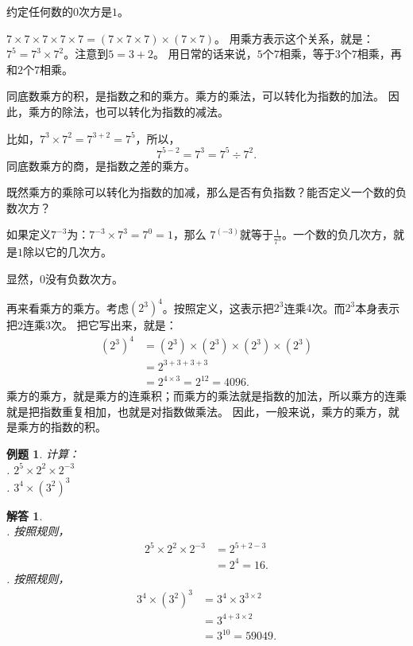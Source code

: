 \documentclass[12pt,UTF8]{ctexbook}
\newtheorem{et}{例题}[section]
\newtheorem*{so}{解答}
\begin{document}
约定任何数的$0$次方是$1$。

$7\times 7\times 7\times 7\times 7 = (7\times 7\times 7)\times (7\times 7)$。
用乘方表示这个关系，就是：$7^5 = 7^3 \times 7^2$。注意到$5 = 3 + 2$。
用日常的话来说，$5$个$7$相乘，等于$3$个$7$相乘，再和$2$个$7$相乘。

同底数乘方的积，是指数之和的乘方。乘方的乘法，可以转化为指数的加法。
因此，乘方的除法，也可以转化为指数的减法。

比如，$7^3 \times 7^2 = 7^{3+2} = 7^5$，所以，
$$7^{5-2} = 7^3 = 7^5 \div 7^2.$$
同底数乘方的商，是指数之差的乘方。

既然乘方的乘除可以转化为指数的加减，那么是否有负指数？能否定义一个数的负数次方？

如果定义$7^{-3}$为：$7^{-3} \times 7^3 = 7^{0} = 1$，那么
$7^{(-3)}$就等于$\frac{1}{7^3}$。一个数的负几次方，就是$1$除以它的几次方。

显然，$0$没有负数次方。

再来看乘方的乘方。考虑$\left(2^3\right)^4$。按照定义，这表示把$2^3$连乘$4$次。而$2^3$本身表示把$2$连乘$3$次。
把它写出来，就是：
\begin{align*}
    \left(2^3\right)^4 &= \left(2^3\right) \times \left(2^3\right) \times \left(2^3\right) \times \left(2^3\right) \\
    &= 2^{3+3+3+3} \\
    &= 2^{4\times 3} = 2^{12} = 4096.
\end{align*}
乘方的乘方，就是乘方的连乘积；而乘方的乘法就是指数的加法，所以乘方的连乘就是把指数重复相加，也就是对指数做乘法。
因此，一般来说，乘方的乘方，就是乘方的指数的积。

\begin{et}
    计算：\\
    . $2^{5} \times 2^2 \times 2^{-3}$ \\
    . $3^4 \times \left(3^2\right)^3$ 

\end{et}

\begin{so}
    \mbox{} \\
    . 按照规则，
    \begin{align*}
        2^{5} \times 2^2 \times 2^{-3} &= 2^{5+2-3} \\
        &= 2^4 = 16.
    \end{align*}
    . 按照规则，
    \begin{align*}
        3^4 \times \left(3^2\right)^3 &= 3^4 \times 3^{3\times 2} \\
        &= 3^{4 + 3\times 2}  \\
        &= 3^10 = 59049.
    \end{align*}
\end{so}
\end{document}
